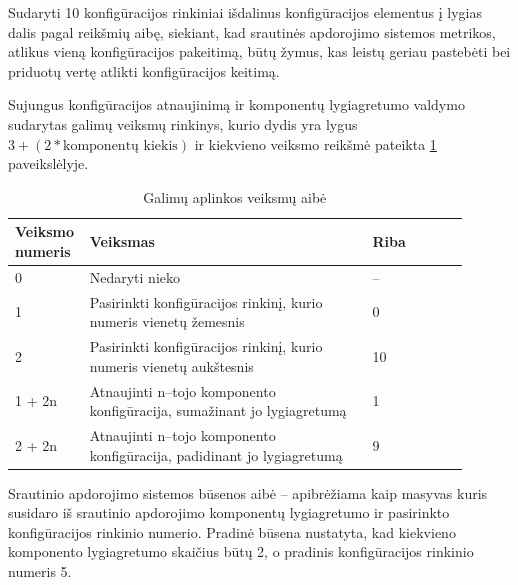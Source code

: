 \documentclass{VUMIFPSbakalaurinis}
\begin{document}
Sudaryti 10 konfigūracijos rinkiniai išdalinus konfigūracijos elementus į lygias dalis pagal reikšmių aibę, siekiant, kad srautinės apdorojimo sistemos metrikos, atlikus vieną konfigūracijos pakeitimą, būtų žymus, kas leistų geriau pastebėti bei priduotų vertę atlikti konfigūracijos keitimą.

Sujungus konfigūracijos atnaujinimą ir komponentų lygiagretumo valdymo sudarytas galimų veiksmų rinkinys, kurio dydis yra lygus \(3 + (2 * \text{komponentų kiekis})\) ir kiekvieno veiksmo reikšmė pateikta \ref{action–space} paveikslėlyje.

\begin{longtable}{|p{0.1\linewidth}|p{0.6\linewidth}|p{0.1\linewidth}|p{0.1\linewidth}|}
    \caption{Galimų aplinkos veiksmų aibė}
    \label{action–space}\\
    \hline
    \rowcolor[HTML]{C0C0C0} 
    Veiksmo numeris                 & Veiksmas & Riba      \\ \hline
    \endfirsthead
    \endhead
    0                               & Nedaryti nieko & –  \\ \hline
    1                               & Pasirinkti konfigūracijos rinkinį, kurio numeris vienetų žemesnis & 0  \\ \hline
    2                               & Pasirinkti konfigūracijos rinkinį, kurio numeris vienetų aukštesnis & 10 \\ \hline
    1 + 2n                          & Atnaujinti n–tojo komponento konfigūracija, sumažinant jo lygiagretumą & 1 \\ \hline
    2 + 2n                          & Atnaujinti n–tojo komponento konfigūracija, padidinant jo lygiagretumą & 9 \\ \hline
\end{longtable}

Srautinio apdorojimo sistemos būsenos aibė – apibrėžiama kaip masyvas kuris susidaro iš srautinio apdorojimo komponentų lygiagretumo ir pasirinkto konfigūracijos rinkinio numerio. Pradinė būsena nustatyta, kad kiekvieno komponento lygiagretumo skaičius būtų 2, o pradinis konfigūracijos rinkinio numeris 5.
\end{document}

